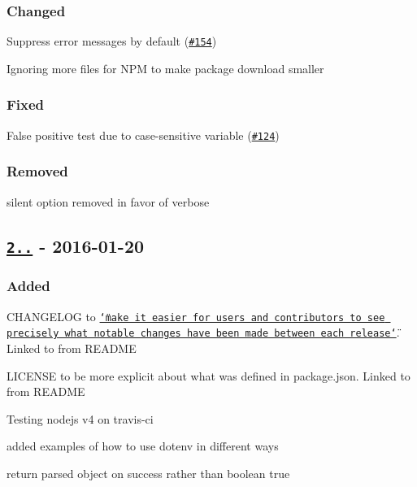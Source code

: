 \subsubsection*{Changed}


\begin{DoxyItemize}
\item Suppress error messages by default (\href{https://github.com/motdotla/dotenv/pull/154}{\tt \#154})
\item Ignoring more files for N\+PM to make package download smaller
\end{DoxyItemize}

\subsubsection*{Fixed}


\begin{DoxyItemize}
\item False positive test due to case-\/sensitive variable (\href{https://github.com/motdotla/dotenv/pull/124}{\tt \#124})
\end{DoxyItemize}

\subsubsection*{Removed}


\begin{DoxyItemize}
\item {\ttfamily silent} option removed in favor of {\ttfamily verbose}
\end{DoxyItemize}

\subsection*{\href{https://github.com/motdotla/dotenv/compare/v1.2.0...v2.0.0}{\tt 2..} -\/ 2016-\/01-\/20}

\subsubsection*{Added}


\begin{DoxyItemize}
\item C\+H\+A\+N\+G\+E\+L\+OG to \href{http://keepachangelog.com/}{\tt \char`\"{}make it easier for users and contributors to see precisely what notable changes have been made between each release\char`\"{}}. Linked to from R\+E\+A\+D\+ME
\item L\+I\+C\+E\+N\+SE to be more explicit about what was defined in {\ttfamily package.\+json}. Linked to from R\+E\+A\+D\+ME
\item Testing nodejs v4 on travis-\/ci
\item added examples of how to use dotenv in different ways
\item return parsed object on success rather than boolean true
\end{DoxyItemize}

